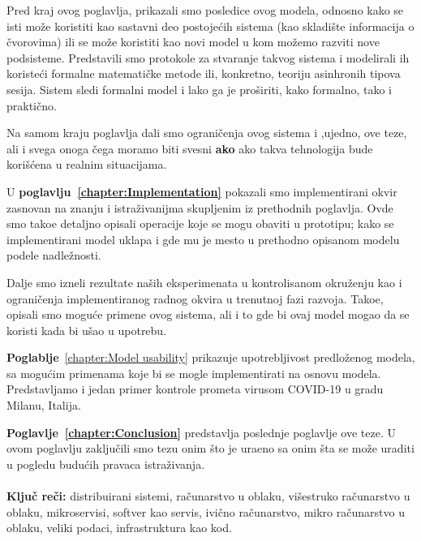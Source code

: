 Pred kraj ovog poglavlja, prikazali smo posledice ovog modela, odnosno kako se isti mo\v ze koristiti kao sastavni deo postoje\'cih sistema (kao skladi\v ste informacija o \v cvorovima) ili se mo\v ze koristiti kao novi model u kom mo\v zemo razviti nove podsisteme. Predstavili smo protokole za stvaranje takvog sistema i modelirali ih koriste\'ci formalne matemati\v cke metode ili, konkretno, teoriju asinhronih tipova sesija. Sistem sledi formalni model i lako ga je pro\v siriti, kako formalno, tako i prakti\v cno.

Na samom kraju poglavlja dali smo ograni\v cenja ovog sistema i ,ujedno, ove teze, ali i svega onoga \v cega moramo biti svesni \textbf{ako} ako takva tehnologija bude kori\v s\'cena u realnim situacijama.

U \textbf{poglavlju~\ref{chapter:Implementation}} pokazali smo implementirani okvir zasnovan na znanju i istra\v zivanijma skupljenim iz prethodnih poglavlja. Ovde smo tako\dj e detaljno opisali operacije koje se mogu obaviti u prototipu; kako se implementirani model uklapa i gde mu je mesto u prethodno opisanom modelu podele nadle\v znosti.

Dalje smo izneli rezultate na\v sih eksperimenata u kontrolisanom okru\v zenju kao i ograni\v cenja implementiranog radnog okvira u trenutnoj fazi razvoja. Tako\dj e, opisali smo mogu\'ce primene ovog sistema, ali i to gde bi ovaj model mogao da se koristi kada bi u\v sao u upotrebu.

\textbf{Poglablje}~\ref{chapter:Model usability} prikazuje upotrebljivost predloženog modela, sa mogućim primenama koje bi se mogle implementirati na osnovu modela. Predstavljamo i jedan primer kontrole prometa virusom COVID-19 u gradu Milanu, Italija.

\textbf{Poglavlje~\ref{chapter:Conclusion}} predstavlja poslednje poglavlje ove teze. U ovom poglavlju zaklju\v cili smo tezu onim \v sto je ura\dj eno sa onim \v sta se mo\v ze uraditi u pogledu budu\'cih pravaca istra\v zivanja.\\\\

\noindent
\textbf{Klju\v c re\v ci:} distribuirani sistemi, ra\v cunarstvo u oblaku, vi\v sestruko ra\v cunarstvo u oblaku, mikroservisi, softver kao servis, ivi\v cno ra\v cunarstvo, mikro ra\v cunarstvo u oblaku, veliki podaci, infrastruktura kao kod.